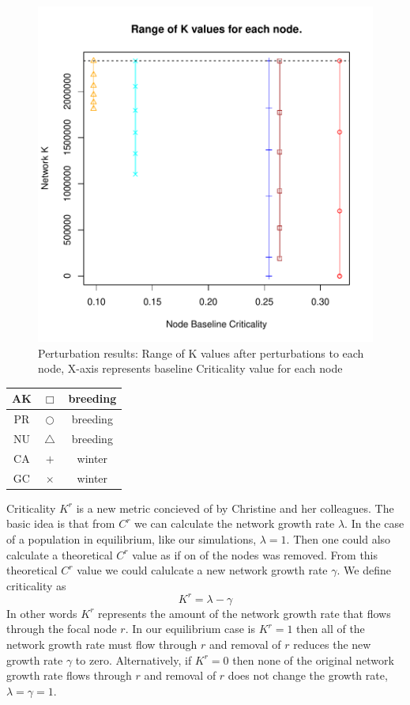 \documentclass[10pt]{article}
\begin{document}
\vspace{-.5cm}
\begin{figure}[H]
\begin{center}
\includegraphics[width=.8\textwidth, height=.8\textwidth]{RGraphics-pintail_barcr_KR}
\caption{Perturbation results: Range of K values after perturbations to each node, X-axis represents baseline Criticality value for each node}\label{fig:pintail_barcr_KR}
\end{center}
\end{figure}

\vspace{-.5cm}
\begin{tabular}{|c|c|c|}
\hline
{\color{Sepia}AK} & $\Box$ & breeding \\
\hline
{\color{red}PR} & $\bigcirc$ & breeding \\
\hline
{\color{orange}NU} & $\triangle$ & breeding \\
\hline
{\color{blue}CA} & $+$ & winter \\
\hline
{\color{cyan}GC} & $\times$ & winter \\
\hline
\end{tabular}

\vspace{1cm}
Criticality $K^r$ is a new metric concieved of by Christine and her colleagues. The basic idea is that from $C^r$ we can calculate the network growth rate $\lambda$. In the case of a population in equilibrium, like our simulations, $\lambda = 1$. Then one could also calculate a theoretical $C^r$ value as if on of the nodes was removed. From this theoretical $C^r$ value we could calulcate a new network growth rate $\gamma$. We define criticality as 
\[K^r = \lambda - \gamma \]
In other words $K^r$ represents the amount of the network growth rate that flows through the focal node $r$. In our equilibrium case is $K^r=1$ then all of the network growth rate must flow through $r$ and removal of $r$ reduces the new growth rate $\gamma$ to zero. Alternatively, if $K^r=0$ then none of the original network growth rate flows through $r$ and removal of $r$ does not change the growth rate, $\lambda=\gamma=1$.
\end{document}
